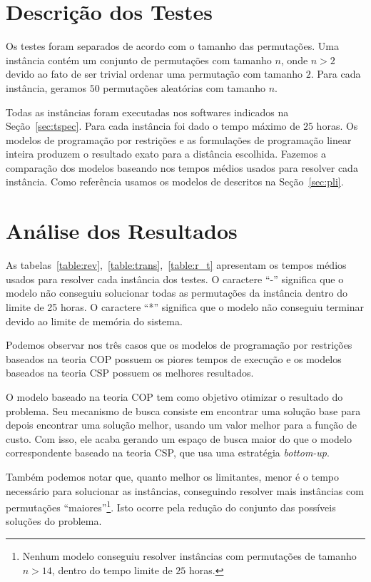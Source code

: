 \section{Descrição dos Testes}
\label{sec:testes}
Os testes foram separados de acordo com o tamanho das permutações. Uma
instância contém um conjunto de permutações com tamanho $n$, onde $n >
2$ devido ao fato de ser trivial ordenar uma permutação com tamanho $2$.
Para cada instância, geramos $50$ permutações aleatórias com tamanho
$n$.

Todas as instâncias foram executadas nos softwares indicados na
Seção~\ref{sec:tspec}. Para cada instância foi dado o tempo máximo de
$25$ horas. Os modelos de programação por restrições e as formulações de
programação linear inteira produzem o resultado exato para a distância
escolhida. Fazemos a comparação dos modelos baseando nos tempos
médios usados para resolver cada instância. Como referência usamos os
modelos de \pli{} descritos na Seção~\ref{sec:pli}.

\section{Análise dos Resultados}
\label{sec:analise}
As tabelas~\ref{table:rev},~\ref{table:trans},~\ref{table:r_t}
apresentam os tempos médios usados para resolver cada instância dos
testes. O caractere ``-'' significa que o modelo não conseguiu
solucionar todas as permutações da instância dentro do limite de 25
horas. O caractere ``*'' significa que o modelo não conseguiu terminar
devido ao limite de memória do sistema.

Podemos observar nos três casos que os modelos de programação por
restrições baseados na teoria COP possuem os piores tempos de execução e
os modelos baseados na teoria CSP possuem os melhores resultados.

O modelo baseado na teoria COP tem como objetivo otimizar o resultado do
problema. Seu mecanismo de busca consiste em encontrar uma solução base
para depois encontrar uma solução melhor, usando um valor melhor para a
função de custo. Com isso, ele acaba gerando um espaço de busca maior do
que o modelo correspondente baseado na teoria CSP, que usa uma
estratégia \textit{bottom-up}.

Também podemos notar que, quanto melhor os limitantes, menor é o tempo
necessário para solucionar as instâncias, conseguindo resolver mais
instâncias com permutações ``maiores''\footnote{Nenhum modelo conseguiu
resolver instâncias com permutações de tamanho $n > 14$, dentro do
tempo limite de $25$ horas.}. Isto ocorre pela redução do conjunto das
possíveis soluções do problema.

